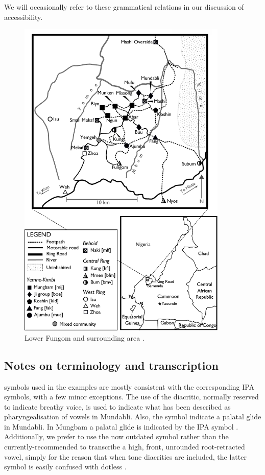 \documentclass[10pt,twoside]{article}
\def\ci#1{{\ipaFont #1}}
\renewcommand{\i}{ı}
\def\ih{ɩ}
\def\ng{ŋ}
\newcommand\tp[1]{\textipa{#1}}	%
\begin{document}
We will occasionally refer to these grammatical relations in
our discussion of accessibility.
\begin{figure}[p]
\centering
\includegraphics[width=10cm]{LowerFungomLanguagesMap.pdf}
\caption{Lower Fungom and surrounding area \citep{good:inprep}.}\label{lfmap}
\end{figure}%

\subsection{Notes on terminology and transcription}\label{secTerminology}

 symbols used in the examples are mostly consistent
with the corresponding IPA symbols, with a few minor exceptions. 
The use of the \ci{[\textsubumlaut{x}]} diacritic, normally reserved to indicate breathy voice,
is used to indicate what has been described as pharyngealisation of
vowels in Mundabli. 
Also, the symbol \ci{[y]} indicate a palatal glide in Mundabli. 
In Mungbam a palatal glide is indicated by the IPA symbol \ci{[j]}. Additionally, we prefer to use the now outdated 
symbol \ci{[\ih]} rather than the currently-recommended \ci{[ɪ]} 
to transcribe a high, front, unrounded root-retracted vowel, simply
for the reason that when tone diacritics are included,
the latter symbol is easily confused with
dotless \ci{[{\i}]}. 
\end{document}
